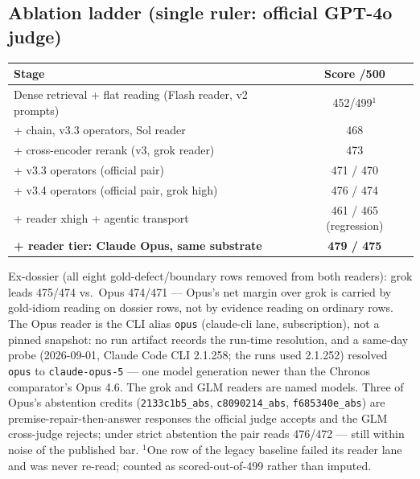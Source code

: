\documentclass[11pt]{article}
\begin{document}
\subsection{Ablation ladder (single ruler: official GPT-4o judge)}
\begin{center}
\begin{tabular}{lc}
\toprule
Stage & Score /500\\
\midrule
Dense retrieval + flat reading (Flash reader, v2 prompts) & 452/499$^{1}$\\
+ chain, v3.3 operators, Sol reader & 468\\
+ cross-encoder rerank (v3, grok reader) & 473\\
+ v3.3 operators (official pair) & 471 / 470\\
+ v3.4 operators (official pair, grok high) & 476 / 474\\
+ reader xhigh + agentic transport & 461 / 465 (regression)\\
\textbf{+ reader tier: Claude Opus, same substrate} & \textbf{479 / 475}\\
\bottomrule
\end{tabular}
\end{center}
{\footnotesize Ex-dossier (all eight gold-defect/boundary rows removed from
both readers): grok leads 475/474 vs.\ Opus 474/471 --- Opus's net margin over
grok is carried by gold-idiom reading on dossier rows, not by evidence reading
on ordinary rows. The Opus reader is the CLI alias \texttt{opus}
(claude-cli lane, subscription), not a pinned snapshot: no run artifact
records the run-time resolution, and a same-day probe (2026-09-01, Claude
Code CLI 2.1.258; the runs used 2.1.252) resolved \texttt{opus} to
\texttt{claude-opus-5} --- one model generation newer than the Chronos
comparator's Opus 4.6. The grok and GLM readers are named models. Three of Opus's abstention credits
(\texttt{2133c1b5\_abs}, \texttt{c8090214\_abs}, \texttt{f685340e\_abs}) are
premise-repair-then-answer responses the official judge accepts and the GLM
cross-judge rejects; under strict abstention the pair reads 476/472 --- still
within noise of the published bar.}
{\footnotesize $^{1}$One row of the legacy baseline failed its reader lane and
was never re-read; counted as scored-out-of-499 rather than imputed.}
\end{document}
